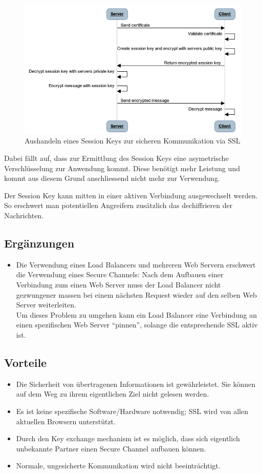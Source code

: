 \begin{figure}[H]
	\centering
	\includegraphics[width=12cm]{content/security/secure-internet-applications/images/secure-channels-key-exchange.png}
	\caption{Aushandeln eines Session Keys zur sicheren Kommunikation via SSL}
\end{figure}

Dabei fällt auf, dass zur Ermittlung des Session Keys eine asymetrische Verschlüsselung zur Anwendung kommt. Diese benötigt mehr Leistung und kommt aus diesem Grund anschliessend nicht mehr zur Verwendung.

Der Session Key kann mitten in einer aktiven Verbindung ausgewechselt werden. So erschwert man potentiellen Angreifern zusätzlich das dechiffrieren der Nachrichten.


\subsection*{Ergänzungen}
\begin{itemize}
	\item Die Verwendung eines Load Balancers und mehreren Web Servern erschwert die Verwendung eines Secure Channels: Nach dem Aufbauen einer Verbindung zum einen Web Server muss der Load Balancer nicht gezwungener massen bei einem nächsten Request wieder auf den selben Web Server weiterleiten.\\Um dieses Problem zu umgehen kann ein Load Balancer eine Verbindung an einen spezifischen Web Server ``pinnen'', solange die entsprechende SSL aktiv ist.
\end{itemize}

\subsection*{Vorteile}
\begin{itemize}
	\item Die Sicherheit von übertragenen Informationen ist gewährleistet. Sie können auf dem Weg zu ihrem eigentlichen Ziel nicht gelesen werden.
	\item Es ist keine spezifische Software/Hardware notwendig; SSL wird von allen aktuellen Browsern unterstützt.
	\item Durch den Key exchange mechanism ist es möglich, dass sich eigentlich unbekannte Partner einen Secure Channel aufbauen können.
	\item Normale, ungesicherte Kommunikation wird nicht beeinträchtigt.
\end{itemize}

